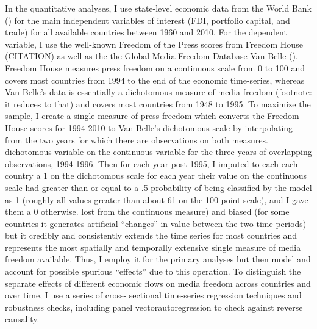 \documentclass[12pt]{report}
\begin{document}
In the quantitative analyses, I use state-level economic data from the World Bank
(\citeyear{WorldDevelopmentIn:2012wl}) for the main independent variables of interest (FDI,
portfolio capital, and trade) for all available countries between 1960 and 2010. For the dependent
variable, I use the well-known Freedom of the Press scores from Freedom House (CITATION) as well as
the the Global Media Freedom Database Van Belle (\citeyear{Belle:1997wo,van2000press}). Freedom
House measures press freedom on a continuous scale from 0 to 100 and covers most countries from 1994
to the end of the economic time-series, whereas Van Belle's data is essentially a dichotomous
measure of media freedom (footnote: it reduces to that) and covers most countries from 1948 to 1995.
To maximize the sample, I create a single measure of press freedom which converts the Freedom House
scores for 1994-2010 to Van Belle's dichotomous scale by interpolating from the two years for which
there are observations on both measures.%
dichotomous variable on the continuous variable for the three years of overlapping observations,
1994-1996. Then for each year post-1995, I imputed to each each country a 1 on the dichotomous scale
for each year their value on the continuous scale had greater than or equal to a .5 probability of
being classified by the model as 1 (roughly all values greater than about 61 on the 100-point
scale), and I gave them a 0 otherwise.%
lost from the continuous measure) and biased (for some countries it generates artificial ``changes''
in value between the two time periods) but it credibly and consistently extends the time series for
most countries and represents the most spatially and temporally extensive single measure of media
freedom available. Thus, I employ it for the primary analyses but then model and account for
possible spurious ``effects'' due to this operation. To distinguish the separate effects of
different economic flows on media freedom across countries and over time, I use a series of cross-
sectional time-series regression techniques and robustness checks, including panel
vectorautoregression to check against reverse causality.
\end{document}
